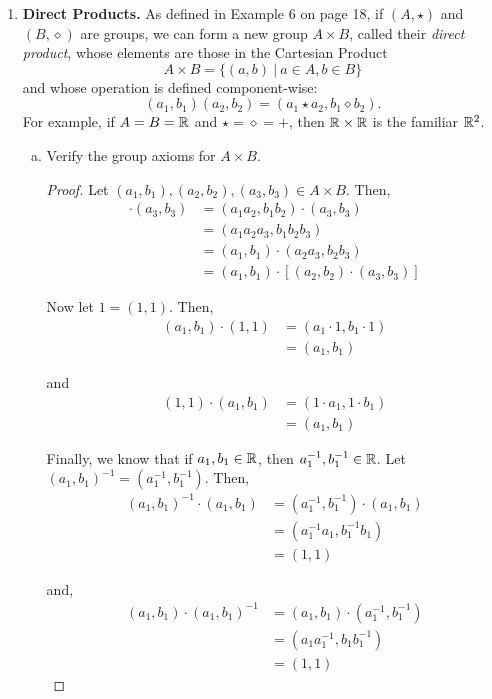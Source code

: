 \documentclass[11pt, reqno]{amsart}
\theoremstyle{plain}
\theoremstyle{definition}
\theoremstyle{example}
\begin{document}
\begin{enumerate}[1.]
\begin{enumerate}[(a)]
\end{enumerate}




\item {\bf Direct Products. } As defined in Example 6 on page 18, if $(A, \star)$ and $(B, \diamond)$ are groups, we can form a new group $A \times B$, called their \emph{direct product}, whose elements are those in the Cartesian Product 
$$A \times B = \{(a,b) ~|~ a \in A, b\in B\}$$
and whose operation is defined component-wise:
$$(a_1, b_1) (a_2, b_2) = (a_1 \star a_2, b_1 \diamond b_2).$$
For example, if $A = B = \mathbb{R}$ and $\star = \diamond = +$, then $\mathbb{R} \times \mathbb{R}$ is the familiar $\mathbb{R}^2$. 
\begin{enumerate}[(a)]
\item Verify the group axioms for $A \times B$. 
\begin{proof}
Let $(a_1, b_1), (a_2, b_2), (a_3, b_3) \in A \times B$. Then,
\begin{align*}
[(a_1, b_1) \cdot (a_2, b_2)] \cdot (a_3, b_3) &= (a_1a_2, b_1b_2) \cdot (a_3, b_3)\\
&= (a_1a_2a_3, b_1b_2b_3)\\
&= (a_1, b_1) \cdot (a_2a_3, b_2b_3)\\
&= (a_1, b_1) \cdot [(a_2, b_2) \cdot (a_3, b_3)]
\end{align*}

Now let $1 = (1, 1)$. Then,
\begin{align*}
(a_1, b_1) \cdot (1, 1) &= (a_1 \cdot 1, b_1 \cdot 1)\\
&= (a_1, b_1)
\end{align*}

and
\begin{align*}
(1, 1) \cdot (a_1, b_1) &= (1 \cdot a_1, 1 \cdot b_1)\\
&= (a_1, b_1)
\end{align*}

Finally, we know that if $a_1, b_1 \in \mathbb{R}$, then $a_1^{-1}, b_1^{-1} \in \mathbb{R}$. Let $(a_1, b_1)^{-1} = (a_1^{-1}, b_1^{-1})$. Then,
\begin{align*}
(a_1, b_1)^{-1} \cdot (a_1, b_1) &= (a_1^{-1}, b_1^{-1}) \cdot (a_1, b_1)\\
&= (a_1^{-1}a_1, b_1^{-1}b_1)\\
&= (1, 1)
\end{align*}

and,
\begin{align*}
(a_1, b_1) \cdot (a_1, b_1)^{-1} &= (a_1, b_1) \cdot (a_1^{-1}, b_1^{-1})\\
&= (a_1a_1^{-1}, b_1b_1^{-1})\\
&= (1, 1)
\end{align*}


\end{proof}
\end{enumerate}
\end{enumerate}
\end{document}
